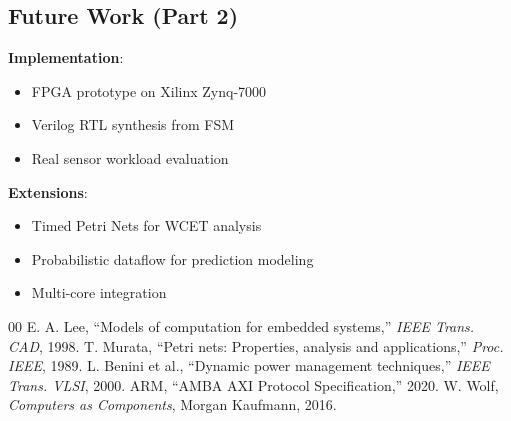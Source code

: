 \documentclass[conference]{IEEEtran}
\begin{document}
\subsection{Future Work (Part 2)}
\textbf{Implementation}:
\begin{itemize}
    \item FPGA prototype on Xilinx Zynq-7000
    \item Verilog RTL synthesis from FSM
    \item Real sensor workload evaluation
\end{itemize}

\textbf{Extensions}:
\begin{itemize}
    \item Timed Petri Nets for WCET analysis
    \item Probabilistic dataflow for prediction modeling
    \item Multi-core integration
\end{itemize}

\begin{thebibliography}{00}
 E. A. Lee, ``Models of computation for embedded systems,'' \textit{IEEE Trans. CAD}, 1998.
 T. Murata, ``Petri nets: Properties, analysis and applications,'' \textit{Proc. IEEE}, 1989.
 L. Benini et al., ``Dynamic power management techniques,'' \textit{IEEE Trans. VLSI}, 2000.
 ARM, ``AMBA AXI Protocol Specification,'' 2020.
 W. Wolf, \textit{Computers as Components}, Morgan Kaufmann, 2016.
\end{thebibliography}
\end{document}
